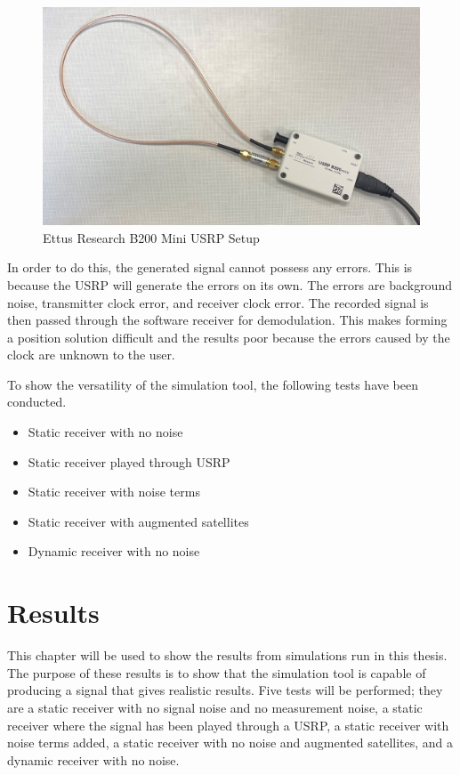 \documentclass[12pt]{report}
\begin{document}
\begin{figure}[h!]
    \centering
    \includegraphics[width=5in]{USRP Setup.jpg}
    \caption{Ettus Research B200 Mini USRP Setup}
    \label{fig:USRPsetup}
\end{figure}

In order to do this, the generated signal cannot possess any errors. This is because the USRP will generate the errors on its own. The errors are background noise, transmitter clock error, and receiver clock error. The recorded signal is then passed through the software receiver for demodulation. This makes forming a position solution difficult and the results poor because the errors caused by the clock are unknown to the user. 

To show the versatility of the simulation tool, the following tests have been conducted.

\begin{itemize}
    \item Static receiver with no noise
    \item Static receiver played through USRP
    \item Static receiver with noise terms
    \item Static receiver with augmented satellites
    \item Dynamic receiver with no noise
\end{itemize}

\chapter{Results}

This chapter will be used to show the results from simulations run in this thesis. The purpose of these results is to show that the simulation tool is capable of producing a signal that gives realistic results. Five tests will be performed; they are a static receiver with no signal noise and no measurement noise, a static receiver where the signal has been played through a USRP, a static receiver with noise terms added, a static receiver with no noise and augmented satellites, and a dynamic receiver with no noise. 
\end{document}
